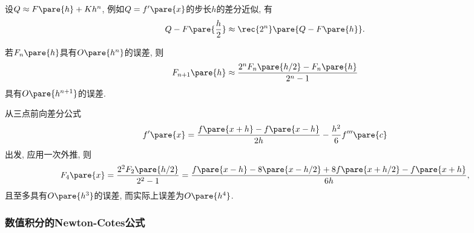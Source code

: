 \documentclass{ctexart}
\begin{document}
设$Q \approx F\pare{h} + Kh^n$, 例如$Q=f'\pare{x}$的步长$h$的差分近似, 有
\[ Q - F\pare{\frac{h}{2}} \approx \rec{2^n}\pare{Q-F\pare{h}}. \]
\begin{theorem}[$n$阶公式的外推]
    若$F_n\pare{h}$具有$O\pare{h^n}$的误差, 则
    \[ F_{n+1}\pare{h}\approx \frac{2^nF_n\pare{h/2} - F_n\pare{h}}{2^n-1} \]
    具有$O\pare{h^{n+1}}$的误差.
\end{theorem}
\begin{ex}
    从三点前向差分公式
    \[ f'\pare{x} = \frac{f\pare{x+h}-f\pare{x-h}}{2h} - \frac{h^2}{6}f'''\pare{c} \]
    出发, 应用一次外推, 则
    \[ F_4\pare{x} = \frac{2^2 F_2\pare{h/2}}{2^2-1} = \frac{f\pare{x-h} - 8\pare{x-h/2} + 8f\pare{x+h/2} - f\pare{x+h}}{6h}, \]
    且至多具有$O\pare{h^3}$的误差, 而实际上误差为$O\pare{h^4}$.
\end{ex}



\subsubsection[Newton-Cotes公式]{数值积分的Newton-Cotes公式} %
\label{ssub:数值积分的newton_cotes公式}
\end{document}
